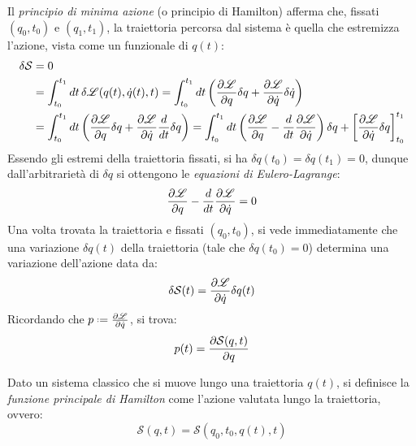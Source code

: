 Il \textit{principio di minima azione} (o principio di Hamilton) afferma che, fissati $ (q_0,t_0) $ e $ (q_1,t_1) $, la traiettoria percorsa dal sistema è quella che estremizza l'azione, vista come un funzionale di $ q(t) $:
\begin{equation*}
	\begin{split}
		\delta \mathcal{S}
		&= 0 \\
		&= \int_{t_0}^{t_1} dt\, \delta \mathscr{L} (q(t), \dot{q}(t), t) = \int_{t_0}^{t_1} dt \left( \frac{\partial \mathscr{L}}{\partial q} \delta q + \frac{\partial \mathscr{L}}{\partial \dot{q}} \delta \dot{q} \right) \\
		&= \int_{t_0}^{t_1} dt \left( \frac{\partial \mathscr{L}}{\partial q} \delta q + \frac{\partial \mathscr{L}}{\partial \dot{q}} \frac{d}{dt} \delta q \right) = \int_{t_0}^{t_1} dt \left( \frac{\partial \mathscr{L}}{\partial q} - \frac{d}{dt} \frac{\partial \mathscr{L}}{\partial \dot{q}} \right) \delta q + \left[ \frac{\partial \mathscr{L}}{\partial \dot{q}} \delta q \right]_{t_0}^{t_1}
	\end{split}
\end{equation*}
Essendo gli estremi della traiettoria fissati, si ha $ \delta q(t_0) = \delta q(t_1) = 0 $, dunque dall'arbitrarietà di $ \delta q $ si ottengono le \textit{equazioni di Eulero-Lagrange}:
\begin{equation}
	\frac{\partial \mathscr{L}}{\partial q} - \frac{d}{dt} \frac{\partial \mathscr{L}}{\partial \dot{q}} = 0
	\label{eq:4.2}
\end{equation}
Una volta trovata la traiettoria e fissati $ (q_0,t_0) $, si vede immediatamente che una variazione $ \delta q(t) $ della traiettoria (tale che $ \delta q(t_0) = 0 $) determina una variazione dell'azione data da:
\begin{equation}
	\delta \mathcal{S}(t) = \frac{\partial \mathscr{L}}{\partial \dot{q}} \delta q(t)
	\label{eq:4.3}
\end{equation}
Ricordando che $ p \defeq \frac{\pa \mathscr{L}}{\pa \dot{q}} $, si trova:
\begin{equation}
	p(t) = \frac{\partial \mathcal{S}(q,t)}{\partial q}
	\label{eq:4.4}
\end{equation}

\begin{definition}
	Dato un sistema classico che si muove lungo una traiettoria $ q(t) $, si definisce la \textit{funzione principale di Hamilton} come l'azione valutata lungo la traiettoria, ovvero:
	\begin{equation}
		\mathcal{S}(q,t) = \mathcal{S}(q_0,t_0,q(t),t)
		\label{eq:4.5}
	\end{equation}
\end{definition}

